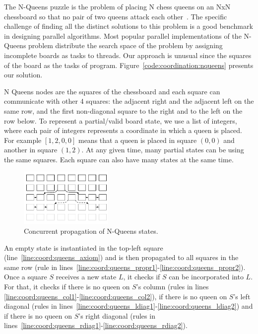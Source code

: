 The N-Queens puzzle is the problem of placing N chess queens on an NxN
chessboard so that no pair of two queens attack each other~\cite{8queens}. The
specific challenge of finding all the distinct solutions to this problem is a
good benchmark in designing parallel algorithms.  Most popular parallel
implementations of the N-Queens problem distribute the search space of the
problem by assigning incomplete boards as tasks to threads.  Our approach is
unusual since the squares of the board as the tasks of program.
Figure~\ref{code:coordination:nqueens} presents our solution.

N Queens nodes are the squares of the chessboard and each square can communicate
with other 4 squares: the adjacent right and the adjacent left on the same row,
and the first non-diagonal square to the right and to the left on the row below.
To represent a partial/valid board state, we use a list of integers, where each
pair of integers represents a coordinate in which a queen is placed. For example
$[1, 2, 0, 0]$ means that a queen is placed in square $(0, 0)$ and another in
square $(1, 2)$. At any given time, many partial states can be using the same
squares.  Each square can also have many states at the same time.

\begin{figure}[ht!]
\includegraphics[width=0.4\textwidth]{figures/coordination/nqueens.pdf}
\caption{Concurrent propagation of N-Queens states.}
\label{coordination:fig:nqueens}
\end{figure}

An empty state is instantiated in the top-left square
(line~\ref{line:coord:queens_axiom}) and is then propagated to all squares in
the same row (rule in
lines~\ref{line:coord:queens_propr1}-\ref{line:coord:queens_propr2}). Once a
square $S$ receives a new state $L$, it checks if $S$ can be incorporated into
$L$. For that, it checks if there is no queen on $S$'s column (rules in lines
\ref{line:coord:queens_col1}-\ref{line:coord:queens_col2}), if there is no queen
on $S$'s left diagonal (rules in
lines~\ref{line:coord:queens_ldiag1}-\ref{line:coord:queens_ldiag2}) and if
there is no queen on $S$'s right diagonal (rules in
lines~\ref{line:coord:queens_rdiag1}-\ref{line:coord:queens_rdiag2}).

